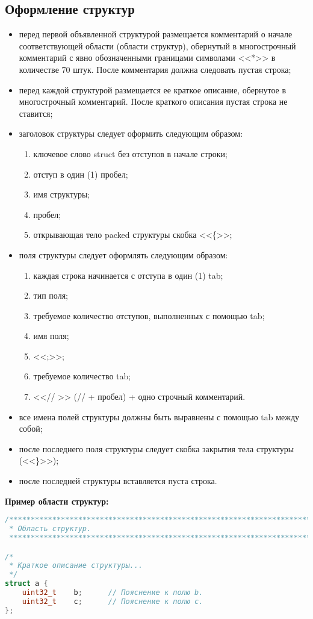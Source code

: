 \subsection{Оформление структур}
\begin{itemize}
	\item перед первой объявленной структурой размещается комментарий о начале соответствующей области (области структур), обернутый в многострочный комментарий с явно обозначенными границами символами <<*>> в количестве 70 штук. После комментария должна следовать  пустая строка;
	\item перед каждой структурой размещается ее краткое описание, обернутое в многострочный комментарий. После краткого описания пустая строка не ставится;
	\item заголовок структуры следует оформить следующим образом:
	\begin{enumerate}
		\item ключевое слово struct без отступов в начале строки;
		\item отступ в один (1) пробел;
		\item имя структуры;
		\item пробел;
		\item открывающая тело packed структуры скобка <<\{>>;
	\end{enumerate}
	\item поля структуры следует оформлять следующим образом:
	\begin{enumerate}
		\item каждая строка начинается с отступа в один (1) tab;
		\item тип поля;
		\item требуемое количество отступов, выполненных с помощью tab;
		\item имя поля;
		\item <<;>>;
		\item требуемое количество tab;
		\item <<// >> (// + пробел) + одно строчный комментарий.
	\end{enumerate}
	\item все имена полей структуры должны быть выравнены с помощью tab между собой;
	\item после последнего поля структуры следует скобка закрытия тела структуры (<<\}>>);
	\item после последней структуры вставляется пуста строка.
\end{itemize}\textbf{Пример области структур:}\begin{lstlisting}[language=C++, frame=tlBR, basicstyle=\fontsize{10}{10}\ttfamily]
/**********************************************************************
 * Область структур.
 **********************************************************************/

/*
 * Краткое описание структуры...
 */
struct a {
	uint32_t	b;		// Пояснение к полю b.
	uint32_t	c;		// Пояснение к полю c.
};\end{lstlisting}